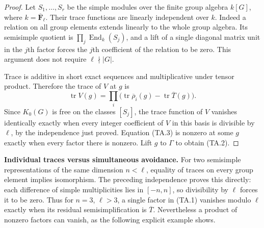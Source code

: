 \documentclass[11pt,a4paper]{article}
\theoremstyle{definition}
\renewcommand{\paragraph}[1]{\par\smallskip\noindent\textbf{#1}\quad\ignorespaces}
\begin{document}
\begin{proof}
Let $S_1,\ldots,S_r$ be the simple modules over the finite
group algebra $k[G]$, where $k=\overline{\mathbf F}_\ell$.
Their trace functions are linearly independent over $k$.
Indeed a relation on all group elements extends linearly
to the whole group algebra. Its semisimple quotient is
$\prod_j\operatorname{End}_k(S_j)$, and a lift of a single
diagonal matrix unit in the $j$th factor forces the $j$th
coefficient of the relation to be zero. This argument
does not require $\ell\nmid|G|$.

Trace is additive in short exact sequences and multiplicative
under tensor product. Therefore the trace of $V$ at $g$ is
\[
 \operatorname{tr}V(g)=
 \prod_i\bigl(\operatorname{tr}\overline\rho_i(g)
                   -\operatorname{tr}\overline T(g)\bigr).
                                                               \tag{TA.3}
\]
Since $K_0(G)$ is free on the classes $[S_j]$, the trace
function of $V$ vanishes identically exactly when every
integer coefficient of $V$ in this basis is divisible by
$\ell$, by the independence just proved. Equation (TA.3)
is nonzero at some $g$ exactly when every factor there is
nonzero. Lift $g$ to $\Gamma$ to obtain (TA.2).
\end{proof}

\paragraph{Individual traces versus simultaneous avoidance.}
For two semisimple representations of the same dimension
$n<\ell$, equality of traces on every group element implies
isomorphism. The preceding independence proves this directly:
each difference of simple multiplicities lies in $[-n,n]$,
so divisibility by $\ell$ forces it to be zero. Thus for
$n=3$, $\ell>3$, a single factor in (TA.1) vanishes modulo
$\ell$ exactly when its residual semisimplification is
$\overline T$. Nevertheless a product of nonzero factors
can vanish, as the following explicit example shows.
\end{document}
